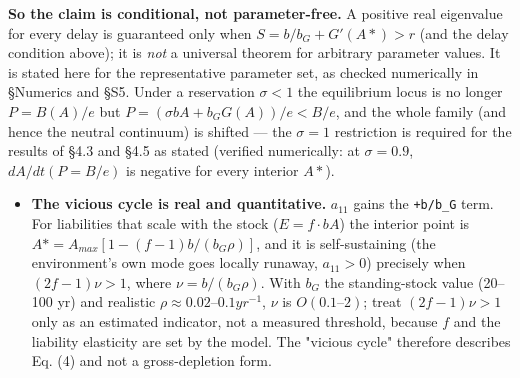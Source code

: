 \documentclass[11pt]{article}
\begin{document}
\textbf{So the claim is conditional, not parameter-free.} A positive real eigenvalue for every delay is guaranteed only when $S = b/b_{G} + G\prime{}(A*) > r$ (and the delay condition above); it is \emph{not} a universal theorem for arbitrary parameter values. It is stated here for the representative parameter set, as checked numerically in §Numerics and §S5. Under a reservation $\sigma{} < 1$ the equilibrium locus is no longer $P = B(A)/e$ but $P = (\sigma{}bA + b_{G} G(A))/e < B/e$, and the whole family (and hence the neutral continuum) is shifted — the $\sigma{} = 1$ restriction is required for the results of §4.3 and §4.5 as stated (verified numerically: at $\sigma{} = 0.9$, $dA/dt(P = B/e)$ is negative for every interior $A*$).

\begin{itemize}
\item \textbf{The vicious cycle is real and quantitative.} $a_{11}$ gains the \texttt{+b/b\_G} term. For liabilities that scale with the stock ($E = f\cdot{}bA$) the interior point is $A* = A_{max}[1 - (f-1)b/(b_{G} \rho{})]$, and it is self-sustaining (the environment's own mode goes locally runaway, $a_{11} > 0$) precisely when $(2f-1)\nu{} > 1$, where $\nu{} = b/(b_{G} \rho{})$. With $b_{G}$ the standing-stock value (20–100 yr) and realistic $\rho{} \approx{} 0.02–0.1 yr^{-1}$, $\nu{}$ is $O(0.1–2)$; treat $(2f-1)\nu{} > 1$ only as an estimated indicator, not a measured threshold, because $f$ and the liability elasticity are set by the model. The "vicious cycle" therefore describes Eq. (4) and not a gross-depletion form.

\end{itemize}
\end{document}
